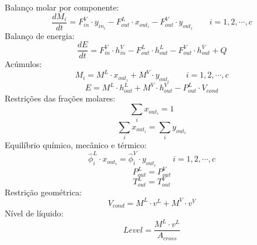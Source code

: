 Balanço molar por componente:
\begin{equation}
\dfrac{dM_i}{dt} = F_{in}^V \cdot y_{in_i} - F_{out}^L  \cdot x_{out_i} - F_{out}^V \cdot y_{out_i}  \qquad i=1,2,\cdots,c
\end{equation}
Balanço de energia:
\begin{equation}
\dfrac{dE}{dt} = F_{in}^V \cdot h_{in}^V - F_{out}^L  \cdot h_{out}^L - F_{out}^V \cdot h_{out}^V + Q
\end{equation}
Acúmulos:
\begin{equation}
M_i = M^L \cdot x_{out_i} + M^V \cdot y_{out_i}  \qquad i=1,2,\cdots,c
\end{equation}
\begin{equation}
E = M^L \cdot h_{out}^L + M^V \cdot h_{out}^V - P_{out}^L \cdot V_{cond}
\end{equation}
Restrições das frações molares:
\begin{equation}
\sum_i x_{out_i} = 1
\end{equation}
\begin{equation}
\sum_i x_{out_i} = \sum_i y_{out_i}
\end{equation}
Equilíbrio químico, mecânico e térmico:
\begin{equation}
\hat{\phi}_i^L \cdot x_{out_i} = \hat{\phi}_i^V \cdot y_{out_i}  \qquad i=1,2,\cdots,c
\end{equation}
\begin{equation}
P_{out}^L = P_{out}^V
\end{equation}
\begin{equation}
T_{out}^L = T_{out}^V
\end{equation}
Restrição geométrica:
\begin{equation}
V_{cond} = M^L \cdot v^L + M^V \cdot v^V
\end{equation}
Nível de líquido:
\begin{equation}
Level = \dfrac {M^L \cdot v^L}{A_{cross}}
\end{equation}

